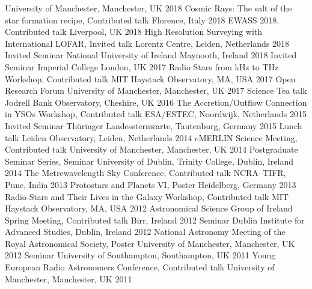 \begin{cvpress}
    {University of Manchester, Manchester, UK}
    {2018}   
   \cvpres
    {Cosmic Rays: The salt of the star formation recipe, Contributed talk}
    {Florence, Italy}
    {2018}
   \cvpres
    {EWASS 2018, Contributed talk}
    {Liverpool, UK}
    {2018}
\cvpres
    {High Resolution Surveying with International LOFAR, Invited talk}
    {Lorentz Centre, Leiden, Netherlands}
    {2018}
   \cvpres
    {Invited Seminar}
    {National University of Ireland Maynooth, Ireland}
    {2018}
   \cvpres
    {Invited Seminar}
    {Imperial College London, UK}
    {2017}
   \cvpres
    {Radio Stars from kHz to THz Workshop, Contributed talk}
    {MIT Haystack Observatory, MA, USA}
    {2017}
   \cvpres
    {Open Research Forum}
    {University of Manchester, Manchester, UK}
    {2017}
  \cvpres
  {Science Tea talk}
  {Jodrell Bank Observatory, Cheshire, UK}
  {2016}
  \cvpres
    {The Accretion/Outflow Connection in YSOs Workshop, Contributed talk}
    {ESA/ESTEC, Noordwijk, Netherlands}
    {2015}
  \cvpres
    {Invited Seminar}
    {Th{\"u}ringer Landessternwarte, Tautenburg, Germany}
    {2015}
  \cvpres
    {Lunch talk}
    {Leiden Observatory, Leiden, Netherlands}
    {2014}
  \cvpres
    {$e$MERLIN Science Meeting, Contributed talk}
    {University of Manchester, Manchester, UK}
    {2014}
  \cvpres
    {Postgraduate Seminar Series, Seminar}
    {University of Dublin, Trinity College, Dublin, Ireland}
    {2014}
   \cvpres
   	{The Metrewavelength Sky Conference, Contributed talk}
    {NCRA--TIFR, Pune, India}
    {2013}
   \cvpres
   	{Protostars and Planets VI, Poster}
    {Heidelberg, Germany}
    {2013}
   \cvpres
   	{Radio Stars and Their Lives in the Galaxy Workshop, Contributed talk}
    {MIT Haystack Observatory, MA, USA}
    {2012}
   \cvpres
   	{Astronomical Science Group of Ireland Spring Meeting, Contributed talk}
    {Birr, Ireland}
    {2012}
   \cvpres
   	{Seminar}
    {Dublin Institute for Advanced Studies, Dublin, Ireland}
    {2012}
   \cvpres
   	{National Astronomy Meeting of the Royal Astronomical Society, Poster}
    {University of Manchester, Manchester, UK}
    {2012}
   \cvpres
   	{Seminar}
    {University of Southampton, Southampton, UK}
    {2011}
   \cvpres
   	{Young European Radio Astronomers Conference, Contributed talk}
    {University of Manchester, Manchester, UK}
    {2011}
\end{cvpress}

